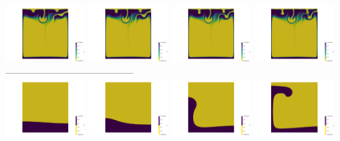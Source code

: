 \begin{itemize}
\begin{center}
\includegraphics[width=3cm]{images/benchmark_vaks97/aspect/lvl7/composition0016}
\includegraphics[width=3cm]{images/benchmark_vaks97/aspect/lvl7/composition0017}
\includegraphics[width=3cm]{images/benchmark_vaks97/aspect/lvl7/composition0018}
\includegraphics[width=3cm]{images/benchmark_vaks97/aspect/lvl7/composition0019}\\
---------------------------------------\\
\includegraphics[width=3cm]{images/benchmark_vaks97/aspect/lvl7/composition_threshold0000}
\includegraphics[width=3cm]{images/benchmark_vaks97/aspect/lvl7/composition_threshold0001}
\includegraphics[width=3cm]{images/benchmark_vaks97/aspect/lvl7/composition_threshold0002}
\includegraphics[width=3cm]{images/benchmark_vaks97/aspect/lvl7/composition_threshold0003}

\end{center}
\end{itemize}
